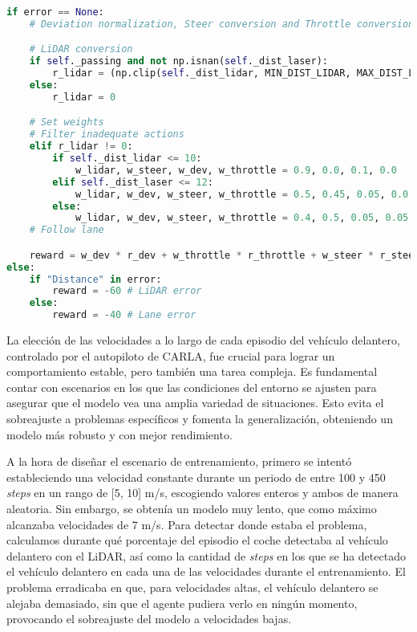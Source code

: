 \begin{code}[H]
\begin{lstlisting}[language=Python]
if error == None:
    # Deviation normalization, Steer conversion and Throttle conversion

    # LiDAR conversion
    if self._passing and not np.isnan(self._dist_laser):
        r_lidar = (np.clip(self._dist_lidar, MIN_DIST_LIDAR, MAX_DIST_LIDAR) - MIN_DIST_LIDAR) / (MAX_DIST_LIDAR - MIN_DIST_LIDAR)       
    else:
        r_lidar = 0

    # Set weights
    # Filter inadequate actions
    elif r_lidar != 0:
        if self._dist_lidar <= 10:
            w_lidar, w_steer, w_dev, w_throttle = 0.9, 0.0, 0.1, 0.0
        elif self._dist_laser <= 12:
            w_lidar, w_dev, w_steer, w_throttle = 0.5, 0.45, 0.05, 0.0
        else:
            w_lidar, w_dev, w_steer, w_throttle = 0.4, 0.5, 0.05, 0.05
    # Follow lane

    reward = w_dev * r_dev + w_throttle * r_throttle + w_steer * r_steer + w_lidar * r_lidar
else:
    if "Distance" in error:
        reward = -60 # LiDAR error
    else:
        reward = -40 # Lane error
\end{lstlisting}
\caption[Función de recompensa respecto al \ac{LiDAR} para control de crucero adaptativo basado \ac{PPO}]{Función de recompensa respecto al \ac{LiDAR} para control de crucero adaptativo basado \ac{PPO}.}
\label{cod:rew_ppo_passing}
\end{code}

La elección de las velocidades a lo largo de cada episodio del vehículo delantero, controlado por el autopiloto de CARLA, fue crucial para lograr un comportamiento estable, pero también una tarea compleja. Es fundamental contar con escenarios en los que las condiciones del entorno se ajusten para asegurar que el modelo vea una amplia variedad de situaciones. Esto evita el sobreajuste a problemas específicos y fomenta la generalización, obteniendo un modelo más robusto y con mejor rendimiento.

A la hora de diseñar el escenario de entrenamiento, primero se intentó estableciendo una velocidad constante durante un periodo de entre 100 y 450 \textit{steps} en un rango de [5, 10] m/s, escogiendo valores enteros y ambos de manera aleatoria. Sin embargo, se obtenía un modelo muy lento, que como máximo alcanzaba velocidades de 7 m/s. Para detectar donde estaba el problema, calculamos durante qué porcentaje del episodio el coche detectaba al vehículo delantero con el \ac{LiDAR}, así como la cantidad de \textit{steps} en los que se ha detectado el vehículo delantero en cada una de las velocidades durante el entrenamiento. El problema erradicaba en que, para velocidades altas, el vehículo delantero se alejaba demasiado, sin que el agente pudiera verlo en ningún momento, provocando el sobreajuste del modelo a velocidades bajas.

